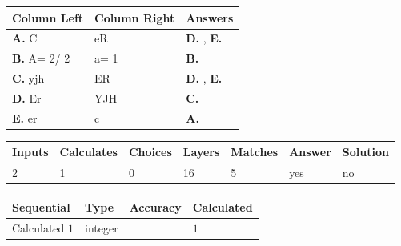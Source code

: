 \documentclass[12pt]{article}
\begin{document}
  
 
 
\noindent{}
  
  
\begin{tabular}{|l|l|l|}
 \hline
 Column Left & Column Right  & Answers       \\ 
 \hline
{\textbf{\large{
A.}}}
C
  & 
eR
 & 
{\textbf{\large{
D.}}}
, 
{\textbf{\large{
E.}}}
 \\ 
 \hline
{\textbf{\large{
B.}}}
 A= %
2/ %
2

  & 
 a= %
1
 & 
{\textbf{\large{
B.}}}
 \\ 
 \hline
{\textbf{\large{
C.}}}
yjh
  & 
ER
 & 
{\textbf{\large{
D.}}}
, 
{\textbf{\large{
E.}}}
 \\ 
 \hline
{\textbf{\large{
D.}}}
Er
  & 
YJH
 & 
{\textbf{\large{
C.}}}
 \\ 
 \hline
{\textbf{\large{
E.}}}
er
  & 
c
 & 
{\textbf{\large{
A.}}}
 \\ 
 \hline
 \end{tabular}
  
  
 
 
\noindent{}
 
 
 
   
   
   
   
\noindent\begin{tabular}{|l|l|l|l|l|l|l|}
 \hline
Inputs & Calculates & Choices & Layers & Matches & Answer & Solution \\ \hline
           2  & 
           1  & 
           0
  & 
          16  & 
           5  & 
  yes & 
  no 
  \\ \hline
 \end{tabular}
   
   
   
   
\noindent{}
   
   
  
  
\noindent\begin{tabular}{|l|l|l|l|}
\hline
 Sequential & Type & Accuracy & Calculated \\ 
\hline
 
 
  Calculated $            1 $ & integer &  & 
  $ 1 $ 
 \\  \hline  
 \end{tabular}
   
\end{document}
